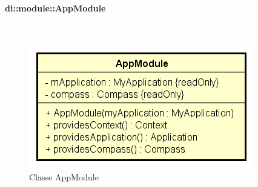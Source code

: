 \documentclass[../DefinizioneDiProdotto.tex]{subfiles}
\begin{document}
\paragraph{di::module::AppModule}
\
\begin{figure}[H]
	\centering
	\includegraphics[width=\maxwidth]{img/AppModule.png}
	\caption{Classe AppModule}\label{fig:di::module::AppModule} 
\end{figure}
\end{document}
